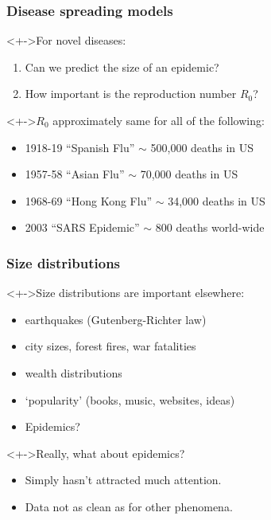 \begin{frame}
  \frametitle{Disease spreading models}


  \begin{block}<+->{For novel diseases:}
    \begin{enumerate}
    \item<+-> Can we predict the size of an epidemic?
    \item<+-> How important is the reproduction number $R_0$?
    \end{enumerate}
  \end{block}

  \begin{block}<+->{$R_0$ approximately same for all of the following:}
    \begin{itemize}
    \item <+->  
      1918-19 ``Spanish Flu'' $\sim$ 500,000 deaths in US
    \item <+->  
      1957-58 ``Asian Flu'' $\sim$ 70,000 deaths in US 
    \item <+->  
      1968-69 ``Hong Kong Flu'' $\sim$ 34,000 deaths in US 
    \item <+->  
      2003 ``SARS Epidemic'' $\sim$ 800 deaths world-wide
    \end{itemize}
  \end{block}

\end{frame}

\begin{frame}
  \frametitle{Size distributions}

  \begin{block}<+->{Size distributions are important elsewhere:}
    \begin{itemize}
    \item<+-> 
      earthquakes (Gutenberg-Richter law)
    \item<+-> 
      city sizes, forest fires, war fatalities
    \item<+-> 
      wealth distributions
    \item<+-> 
      `popularity' (books, music, websites, ideas)
    \item<+-> 
      \alert{Epidemics?}
    \end{itemize}
  \end{block}


  \begin{block}<+->{Really, what about epidemics?}

    \begin{itemize}
    \item <+-> Simply hasn't attracted much attention.
    \item <+-> Data not as clean as for other phenomena.
    \end{itemize}
    
  \end{block}

\end{frame}

